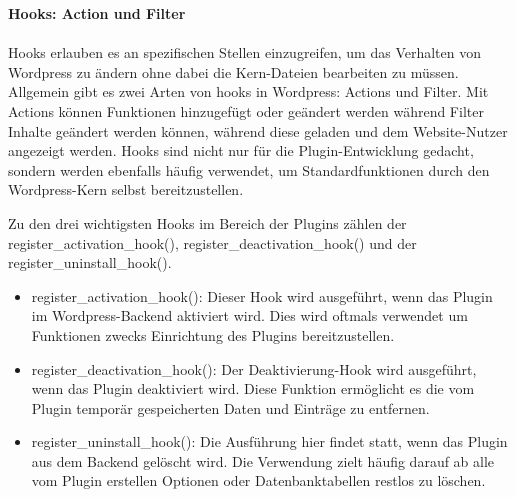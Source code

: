 \newpage
\textbf{Hooks: Action und Filter}\\\\
Hooks erlauben es an spezifischen Stellen einzugreifen, um das Verhalten von Wordpress zu ändern ohne dabei die Kern-Dateien bearbeiten zu müssen.
Allgemein gibt es zwei Arten von hooks in Wordpress: Actions und Filter.
Mit Actions können Funktionen hinzugefügt oder geändert werden während Filter Inhalte geändert werden können, während diese geladen und dem Website-Nutzer angezeigt werden.
Hooks sind nicht nur für die Plugin-Entwicklung gedacht, sondern werden ebenfalls häufig verwendet, um Standardfunktionen durch den Wordpress-Kern selbst bereitzustellen.

Zu den drei wichtigsten Hooks im Bereich der Plugins zählen der register\_activation\_hook(), register\_deactivation\_hook() und der register\_uninstall\_hook().

\begin{itemize}
 \item register\_activation\_hook(): Dieser Hook wird ausgeführt, wenn das Plugin im Wordpress-Backend aktiviert wird. Dies wird oftmals verwendet um Funktionen zwecks Einrichtung des Plugins bereitzustellen.
 \item register\_deactivation\_hook(): Der Deaktivierung-Hook wird ausgeführt, wenn das Plugin deaktiviert wird. Diese Funktion ermöglicht es die vom Plugin temporär gespeicherten Daten und Einträge zu entfernen.
 \item register\_uninstall\_hook(): Die Ausführung hier findet statt, wenn das Plugin aus dem Backend gelöscht wird. Die Verwendung zielt häufig darauf ab alle vom Plugin erstellen Optionen oder Datenbanktabellen restlos zu löschen.
\end{itemize}






